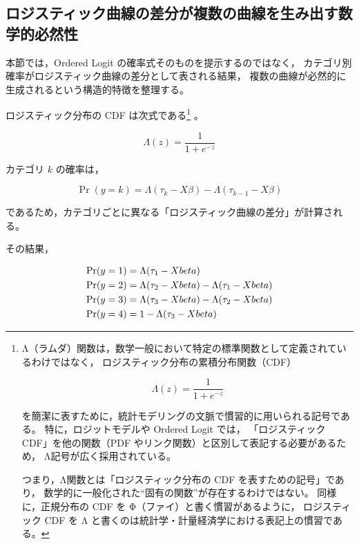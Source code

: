 \subsection{ロジスティック曲線の差分が複数の曲線を生み出す数学的必然性}

本節では，Ordered Logit の確率式そのものを提示するのではなく，
カテゴリ別確率がロジスティック曲線の差分として表される結果，
複数の曲線が必然的に生成されるという構造的特徴を整理する。


ロジスティック分布の CDF は次式である\footnote{
Λ（ラムダ）関数は，数学一般において特定の標準関数として定義されているわけではなく，
ロジスティック分布の累積分布関数（CDF）


\[
\Lambda(z)=\frac{1}{1+e^{-z}}
\]


を簡潔に表すために，統計モデリングの文脈で慣習的に用いられる記号である。
特に，ロジットモデルや Ordered Logit では，
「ロジスティック CDF」を他の関数（PDF やリンク関数）と区別して表記する必要があるため，
Λ記号が広く採用されている。

つまり，Λ関数とは「ロジスティック分布の CDF を表すための記号」であり，
数学的に一般化された“固有の関数”が存在するわけではない。
同様に，正規分布の CDF を Φ（ファイ）と書く慣習があるように，
ロジスティック CDF を Λ と書くのは統計学・計量経済学における表記上の慣習である。
}
。



\[
\Lambda(z) = \frac{1}{1 + e^{-z}}
\]



カテゴリ $k$ の確率は，



\[
\Pr(y=k)
=
\Lambda(\tau_k - X\beta)
-
\Lambda(\tau_{k-1} - X\beta)
\]



であるため，カテゴリごとに異なる「ロジスティック曲線の差分」が計算される。

その結果，



\[
\begin{aligned}
\Pr(y=1) &= \Lambda(\tau_1 - X\beta) \\ \vspace{2mm}
\Pr(y=2) &= \Lambda(\tau_2 - X\beta) - \Lambda(\tau_1 - X\beta) \\ \vspace{2mm}
\Pr(y=3) &= \Lambda(\tau_3 - X\beta) - \Lambda(\tau_2 - X\beta) \\ \vspace{2mm}
\Pr(y=4) &= 1 - \Lambda(\tau_3 - X\beta)
\end{aligned}
\]



